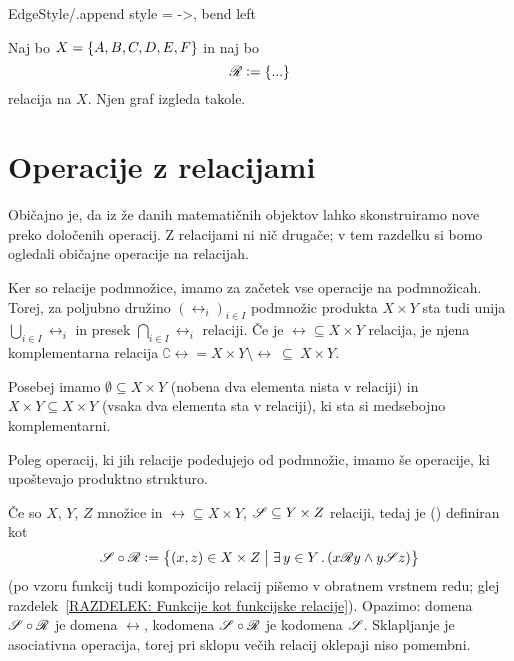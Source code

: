 		\GraphInit[vstyle = Normal]
		\tikzset
		{
			EdgeStyle/.append style = {->, bend left}
		}
		
		\begin{zgled}\label{ZGLED: graf relacije}
			Naj bo $X = \set{A, B, C, D, E, F}$ in naj bo
			\[\rel \dfeq \set{...}\]
			relacija na $X$. Njen graf izgleda takole.
			
		\end{zgled}
	
	
	\section{Operacije z relacijami}\label{RAZDELEK: Operacije z relacijami}
	
		Običajno je, da iz že danih matematičnih objektov lahko skonstruiramo nove preko določenih operacij. Z relacijami ni nič drugače; v tem razdelku si bomo ogledali običajne operacije na relacijah.
		
		Ker so relacije podmnožice, imamo za začetek vse operacije na podmnožicah. Torej, za poljubno družino $(\rel_i)_{i \in I}$ podmnožic produkta $X \times Y$ sta tudi unija $\bigcup_{i \in I} \rel_i$ in presek $\bigcap_{i \in I} \rel_i$ relaciji. Če je $\rel \subseteq X \times Y$ relacija, je njena komplementarna relacija $\complement{\rel} = X \times Y \setminus \rel \ \subseteq \ X \times Y$.
		
		Posebej imamo  $\emptyset \subseteq X \times Y$ (nobena dva elementa nista v relaciji) in  $X \times Y \subseteq X \times Y$ (vsaka dva elementa sta v relaciji), ki sta si medsebojno komplementarni.
		
		Poleg operacij, ki jih relacije podedujejo od podmnožic, imamo še operacije, ki upoštevajo produktno strukturo.
		
		Če so $X$, $Y$, $Z$ množice in $\rel \subseteq X \times Y$, $\srel \subseteq Y \times Z$ relaciji, tedaj je  ()  definiran kot
		\[\srel \circ \rel \dfeq \set[1]{(x, z) \in X \times Z}{\some{y}[Y]{x \rel y \land y \srel z}}\]
		(po vzoru funkcij tudi kompozicijo relacij pišemo v obratnem vrstnem redu; glej razdelek~\ref{RAZDELEK: Funkcije kot funkcijske relacije}). Opazimo: domena $\srel \circ \rel$ je domena $\rel$, kodomena $\srel \circ \rel$ je kodomena $\srel$. Sklapljanje je asociativna operacija, torej pri sklopu večih relacij oklepaji niso pomembni.
		
